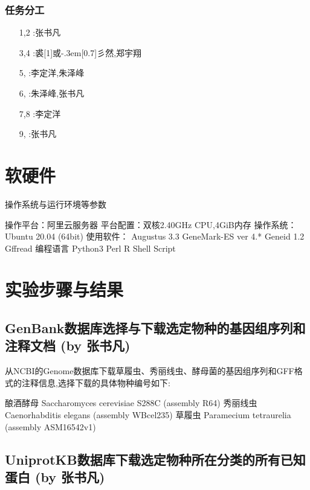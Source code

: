 \documentclass[12pt]{ctexart}
\newcommand{\yu}{\hbox{\scalebox{1}[1]{或}\kern-.3em\scalebox{0.3}[0.7]{彡}}}
\begin{document}
\subsubsection{任务分工}

\begin{itemize}
    \item [1,2]:张书凡
    \item [3,4]:裘\yu 然,郑宇翔
    \item [5,]:李定洋,朱泽峰
    \item [6,]:朱泽峰,张书凡
    \item [7,8]:李定洋
    \item [9,]:张书凡
\end{itemize}

\section{软硬件}

操作系统与运行环境等参数

\begin{outline}[enumerate]
\1 操作平台：阿里云服务器
\1 平台配置：双核2.40GHz CPU,4GiB内存
\1 操作系统：Ubuntu 20.04 (64bit)
\1 使用软件：
    \2 Augustus 3.3
    \2 GeneMark-ES ver 4.*
    \2 Geneid 1.2
    \2 Gffread
\1 编程语言
    \2 Python3
    \2 Perl
    \2 R
    \2 Shell Script
\end{outline}


\section{实验步骤与结果}

\subsection{GenBank数据库选择与下载选定物种的基因组序列和注释文档 (by 张书凡)}

从NCBI的Genome数据库下载草履虫、秀丽线虫、酵母菌的基因组序列和GFF格式的注释信息,选择下载的具体物种编号如下:

\begin{outline}[enumerate]
\1 酿酒酵母
\2 Saccharomyces cerevisiae S288C (assembly R64)
\1 秀丽线虫
\2 Caenorhabditis elegans (assembly WBcel235)
\1 草履虫
\2 Paramecium tetraurelia (assembly ASM16542v1)
\end{outline}


\subsection{UniprotKB数据库下载选定物种所在分类的所有已知蛋白 (by 张书凡)}
\end{document}
